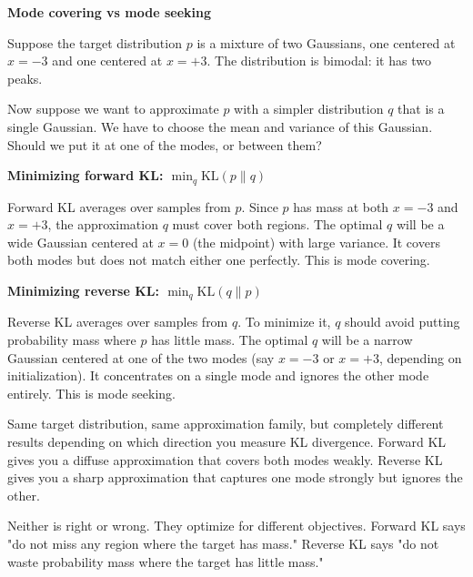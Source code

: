 \begin{examplebox}
\textbf{Mode covering vs mode seeking}

\vspace{0.5em}

Suppose the target distribution $p$ is a mixture of two Gaussians, one centered at $x = -3$ and one centered at $x = +3$. The distribution is bimodal: it has two peaks.

\vspace{0.5em}

Now suppose we want to approximate $p$ with a simpler distribution $q$ that is a single Gaussian. We have to choose the mean and variance of this Gaussian. Should we put it at one of the modes, or between them?

\vspace{0.5em}

\textbf{Minimizing forward KL: $\min_q \text{KL}(p \| q)$}

Forward KL averages over samples from $p$. Since $p$ has mass at both $x = -3$ and $x = +3$, the approximation $q$ must cover both regions. The optimal $q$ will be a wide Gaussian centered at $x = 0$ (the midpoint) with large variance. It covers both modes but does not match either one perfectly. This is mode covering.

\vspace{0.5em}

\textbf{Minimizing reverse KL: $\min_q \text{KL}(q \| p)$}

Reverse KL averages over samples from $q$. To minimize it, $q$ should avoid putting probability mass where $p$ has little mass. The optimal $q$ will be a narrow Gaussian centered at one of the two modes (say $x = -3$ or $x = +3$, depending on initialization). It concentrates on a single mode and ignores the other mode entirely. This is mode seeking.

\vspace{0.5em}

Same target distribution, same approximation family, but completely different results depending on which direction you measure KL divergence. Forward KL gives you a diffuse approximation that covers both modes weakly. Reverse KL gives you a sharp approximation that captures one mode strongly but ignores the other.

\vspace{0.5em}

Neither is right or wrong. They optimize for different objectives. Forward KL says "do not miss any region where the target has mass." Reverse KL says "do not waste probability mass where the target has little mass."
\end{examplebox}

